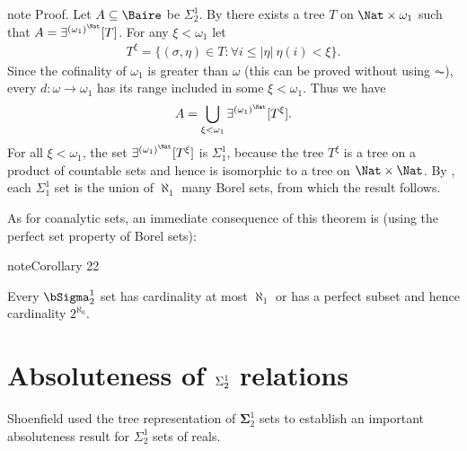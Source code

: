 \documentclass[letterpaper,10pt,english]{jupyterBook}
\begin{document}
\begin{sphinxadmonition}{note}
\sphinxAtStartPar
Proof. Let \(A \subseteq \Baire\) be \(\Sigma^1_2\). By {\hyperref[\detokenize{shoenfield:thm-tree-repr-sig12}]{}} there exists a tree \(T\) on \(\Nat \times \omega_1\) such that \(A = \exists^{(\omega_1)^\Nat}[T]\). For any \(\xi < \omega_1\) let
\begin{equation*}
\begin{split}
    T^\xi = \{ (\sigma,\eta) \in T\colon \forall i \leq |\eta|\:  \eta(i) < \xi \}.
\end{split}
\end{equation*}
\sphinxAtStartPar
Since the cofinality of \(\omega_1\) is greater than \(\omega\) (this can be proved without using \(\AC\)), every \(d: \omega \to \omega_1\) has its range included in some \(\xi < \omega_1\). Thus we have
\begin{equation*}
\begin{split}
	A = \bigcup_{\xi < \omega_1} \exists^{(\omega_1)^\Nat}[T^\xi].
\end{split}
\end{equation*}
\sphinxAtStartPar
For all \(\xi < \omega_1\), the set \(\exists^{(\omega_1)^\Nat}[T^\xi]\) is \(\Sigma^1_1\), because the tree \(T^\xi\) is a tree on a product of countable sets and hence is isomorphic to a tree on \(\Nat \times \Nat\). By {\hyperref[\detokenize{coanalytic:cor-aleph-union-intersect}]{}}, each \(\Sigma^1_1\) set is the union of \(\aleph_1\) many Borel sets, from which the result follows.
\end{sphinxadmonition}

\sphinxAtStartPar
As for co\sphinxhyphen{}analytic sets, an immediate consequence of this theorem is (using the perfect set property of Borel sets):
\label{shoenfield:cor-cardinality-sigma12}
\begin{sphinxadmonition}{note}{Corollary 22}



\sphinxAtStartPar
Every \(\bSigma^1_2\) set has cardinality at most \(\aleph_1\) or has a perfect subset and hence cardinality \(2^{\aleph_0}\).
\end{sphinxadmonition}


\section{Absoluteness of \protect\(\Sigma^1_2\protect\) relations}
\label{\detokenize{shoenfield:absoluteness-of-sigma-1-2-relations}}
\sphinxAtStartPar
Shoenfield used the tree representation of \(\mathbf{\Sigma}^1_2\) sets to establish an important absoluteness result for \(\Sigma^1_2\) sets of reals.
\end{document}
